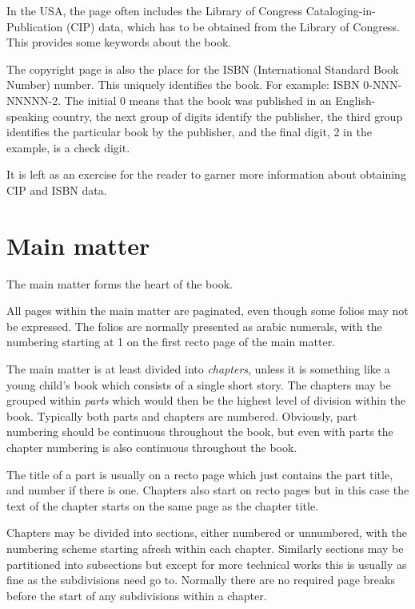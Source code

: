 \documentclass[10pt,letterpaper]{memoir}
\begin{document}
    In the USA, the page often includes the Library of Congress 
Cataloging-in-Publication (CIP) data, 
which has to be obtained from the
Library of Congress. This provides some keywords about the book.

    The copyright page is also the place for the ISBN 
(International
Standard Book Number) number. This uniquely identifies the book. For example:
ISBN 0-NNN-NNNNN-2. The initial 0 means that the book was published in an
English-speaking country, the next group of digits identify the publisher,
the third group identifies the particular book by the publisher, and the final
digit, 2 in the example, is a check digit.

    It is left as an exercise for the reader to garner more information about
obtaining CIP and ISBN data.

\section{Main matter}

    The main matter forms the heart of the book.

    All pages within the main matter are paginated, even though some folios may
not be expressed. The folios are normally presented as arabic numerals, with 
the numbering starting at 1 on the first recto page of the main matter.

    The main matter is at least divided into \emph{chapters}, 
unless it is something like a 
young child's book which consists of a single short story. The chapters
may be grouped within \emph{parts} which would then be the highest level
of division within the book. Typically both parts and chapters are numbered.
Obviously, part numbering should be continuous throughout the book, but even
with parts the chapter numbering is also continuous throughout the book.

    The title of a part is usually on a recto page which just contains the
part title, and number if there is one. Chapters also start on recto pages
but in this case the text of the chapter starts on the same page as the chapter
title.

    Chapters may be divided into sections, either numbered or unnumbered, with
the numbering scheme starting afresh within each chapter. Similarly sections
may be partitioned into subsections but except for more technical works this 
is usually as fine as the subdivisions need go to. Normally there are no 
required page 
breaks before the start of any subdivisions within a chapter.
\end{document}
